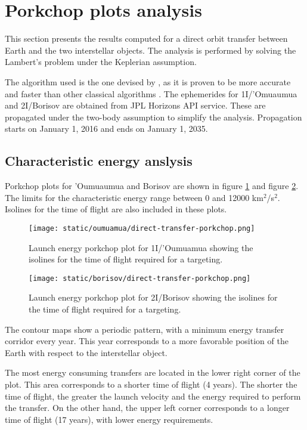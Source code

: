 \section{Porkchop plots analysis}

This section presents the results computed for a direct orbit transfer between
Earth and the two interstellar objects. The analysis is performed by solving the
Lambert's problem under the Keplerian assumption.

The algorithm used is the one devised by \cite{izzo2015}, as it is proven to be
more accurate and faster than other classical algorithms \cite{martinez2021}.
The ephemerides for 1I/'Omuaumua and 2I/Borisov are obtained from JPL Horizons
API service. These are propagated under the two-body assumption to simplify the
analysis. Propagation starts on January 1, 2016 and ends on January 1, 2035.

\subsection{Characteristic energy anslysis}

Porkchop plots for 'Oumuaumua and Borisov are shown in figure
\ref{fig:oumuamua-direct-transfer-porkchop} and figure
\ref{fig:borisov-direct-transfer-porkchop}. The limits for the characteristic
energy range between 0 and 12000 km$^2$/s$^2$. Isolines for the time of flight
are also included in these plots.

\newpage
\begin{figure}[H]
  \centering
  \texttt{[image: static/oumuamua/direct-transfer-porkchop.png]}
  \caption{Launch energy porkchop plot for 1I/'Oumuamua showing the isolines for
        the time of flight required for a targeting.}
  \label{fig:oumuamua-direct-transfer-porkchop}
\end{figure}
\begin{figure}[H]
  \centering
  \texttt{[image: static/borisov/direct-transfer-porkchop.png]}
  \caption{Launch energy porkchop plot for 2I/Borisov showing the isolines for
        the time of flight required for a targeting.}
  \label{fig:borisov-direct-transfer-porkchop}
\end{figure}
\newpage

The contour maps show a periodic pattern, with a minimum energy transfer
corridor every year. This year corresponds to a more favorable position of the
Earth with respect to the interstellar object.

The most energy consuming transfers are located in the lower right corner of the
plot. This area corresponds to a shorter time of flight (4 years). The shorter
the time of flight, the greater the launch velocity and the energy required to
perform the transfer. On the other hand, the upper left corner corresponds to a
longer time of flight (17 years), with lower energy requirements.

